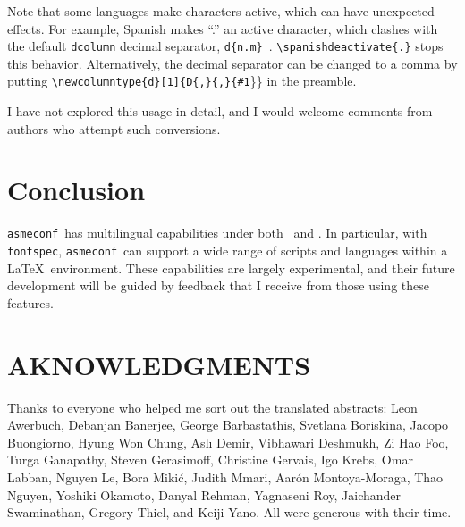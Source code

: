 \documentclass[colorlinks,nofoot,spanish,japanese,russian,greek,ukrainian,vietnamese,french,portuguese,turkish,polish,indonesian,italian,german,latin,serbianc,bidi=basic]{asmeconf}
\newcommand*\FS{{\upshape\texttt{fontspec}}}
\newcommand*\LLT{{\upshape\LuaLaTeX}}
\newcommand*\AC{{\upshape\texttt{asmeconf}}}
\newcommand*\PLT{{\upshape\texttt{\hologo{pdfLaTeX}}}}
\begin{document}
Note that some languages make characters active, which can have unexpected effects. For example, Spanish makes ``.'' an active character, which clashes with the default \texttt{dcolumn} decimal separator, \texttt{d\{n.m\}}~\cite{dpc}. \texttt{\textbackslash spanishdeactivate\{.\}} stops this behavior. Alternatively, the decimal separator can be changed to a comma by putting \texttt{\textbackslash newcolumntype\{d\}[1]\{D\{,\}\{,\}\{\#1}\}\} in the preamble.

I have not explored this usage in detail, and I would welcome comments from authors who attempt such conversions.


\section{Conclusion}
\AC\ has multilingual capabilities under both \PLT\ and \LLT.  In particular, with \FS, \AC\ can support a wide range of scripts and languages within a \LaTeX\ environment. These capabilities are largely experimental, and their future development will be guided by feedback that I receive from those using these features.


\section{AKNOWLEDGMENTS}
Thanks to everyone who helped me sort out the translated abstracts: Leon Awerbuch, Debanjan Banerjee, George Barbastathis, Svetlana Boriskina, Jacopo Buongiorno, Hyung Won Chung, Aslı Demir, Vibhawari Deshmukh, Zi Hao Foo, Turga Ganapathy, Steven Gerasimoff, Christine Gervais, Igo Krebs, Omar Labban, Nguyen Le, Bora Mikić, Judith Mmari, Aarón Montoya-Moraga, Thao Nguyen, Yoshiki Okamoto, Danyal Rehman, Yagnaseni Roy, Jaichander Swaminathan, Gregory Thiel, and Keiji Yano. All were generous with their time.



\end{document}
